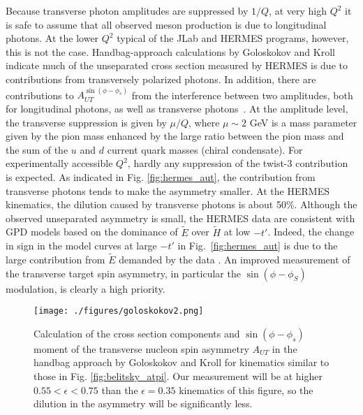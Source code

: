 Because transverse photon amplitudes are suppressed by $1/Q$, at very high
$Q^2$ it is safe to assume that all observed meson production is due to
longitudinal photons.  At the lower $Q^2$ typical of the JLab and HERMES
programs, however, this is not the case.  Handbag-approach
calculations by Goloskokov and Kroll
\cite{Go10} indicate much of the unseparated cross section measured by HERMES
\cite{hermes10} is due to contributions from transversely polarized photons.
In addition, there are contributions to $A_{UT}^{\sin(\phi-\phi_s)}$ from the
interference between two amplitudes, both for longitudinal photons, as well as
transverse photons~\cite{Di05}.
At the amplitude level, the transverse suppression is given by $\mu/Q$, where
$\mu\sim 2$ GeV is a mass parameter given by the pion mass enhanced by the
large ratio between the pion mass and the sum of the $u$ and $d$ current quark
masses (chiral condensate).  For experimentally accessible $Q^2$, hardly any
suppression of the twist-3 contribution is expected.  As indicated in
Fig. \ref{fig:hermes_aut}, the contribution from transverse photons tends to
make the asymmetry smaller.  At the HERMES kinematics, the dilution caused by
transverse photons is about 50\%.  Although the observed unseparated asymmetry
is small, the HERMES data are consistent with GPD models based on the dominance
of $\tilde{E}$ over $\tilde{H}$ at low $-t'$.  Indeed, the change in sign in
the model curves at large $-t'$ in Fig.~\ref{fig:hermes_aut} is due to the
large contribution from $\tilde{E}$ demanded by the data \cite{Go10}.  An
improved measurement of the transverse target spin asymmetry, in particular the
$\sin(\phi-\phi_S)$ modulation, is clearly a high priority.

\begin{figure}[hbt!]
\begin{center}
\texttt{[image: ./figures/goloskokov2.png]}
\caption{\label{fig:golo_aut}
\footnotesize{
Calculation of the cross section components and $\sin(\phi-\phi_s)$ moment of
the transverse nucleon spin asymmetry $A_{UT}$ in the handbag approach by
Goloskokov and Kroll \cite{GoPC} for kinematics similar to those in
Fig. \ref{fig:belitsky_atpi}.  Our measurement will be at higher
$0.55<\epsilon<0.75$ than the $\epsilon=0.35$ kinematics of this figure,
so the dilution in the asymmetry will be significantly less.}}
\end{center}
\end{figure}


